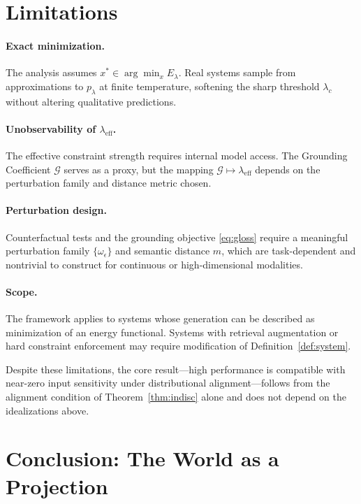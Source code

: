 \documentclass[twocolumn,10pt]{article}
\theoremstyle{thmstyle}
\theoremstyle{defstyle}
\newcommand{\GC}{\mathcal{G}}
\newcommand{\leff}{\lambda_{\mathrm{eff}}}
\begin{document}
\section{Limitations}
\label{sec:limitations}

\paragraph{Exact minimization.}
The analysis assumes $x^*\in\arg\min_x E_\lambda$. Real systems sample
from approximations to $p_\lambda$ at finite temperature, softening the
sharp threshold $\lambda_c$ without altering qualitative predictions.

\paragraph{Unobservability of $\leff$.}
The effective constraint strength requires internal model access. The
Grounding Coefficient $\GC$ serves as a proxy, but the mapping
$\GC\mapsto\leff$ depends on the perturbation family and distance metric
chosen.

\paragraph{Perturbation design.}
Counterfactual tests and the grounding objective \eqref{eq:gloss} require
a meaningful perturbation family $\{\omega_\epsilon\}$ and semantic
distance $m$, which are task-dependent and nontrivial to construct for
continuous or high-dimensional modalities.

\paragraph{Scope.}
The framework applies to systems whose generation can be described as
minimization of an energy functional. Systems with retrieval augmentation
or hard constraint enforcement may require modification of
Definition~\ref{def:system}.

Despite these limitations, the core result---high performance is
compatible with near-zero input sensitivity under distributional
alignment---follows from the alignment condition of
Theorem~\ref{thm:indisc} alone and does not depend on the idealizations
above.

\section{Conclusion: The World as a Projection}
\label{sec:conclusion}
\end{document}
